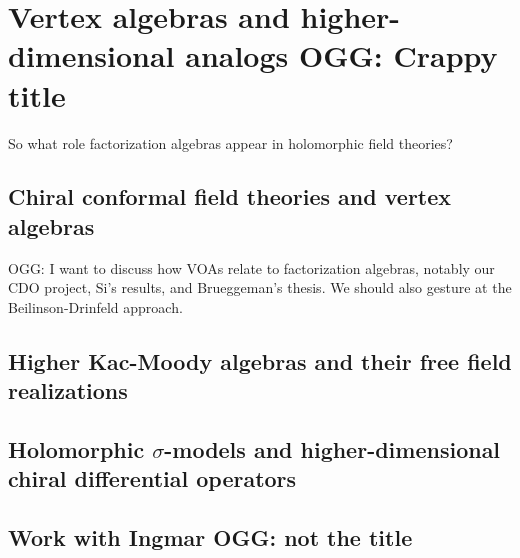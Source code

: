 \documentclass[11pt]{amsart}
\author{Owen Gwilliam and Brian R. Williams}
\date{\today}
\def\owen#1{{\textcolor{green!65!black}{OGG: {#1}}}}
\begin{document}

\section{Vertex algebras and higher-dimensional analogs \owen{Crappy title}}

So what role  factorization algebras appear in holomorphic field theories?


\subsection{Chiral conformal field theories and vertex algebras}

\owen{I want to discuss how VOAs relate to factorization algebras, notably our CDO project, Si's results, and Brueggeman's thesis. We should also gesture at the Beilinson-Drinfeld approach.}

\subsection{Higher Kac-Moody algebras and their free field realizations}

\subsection{Holomorphic $\sigma$-models and higher-dimensional chiral differential operators}

\subsection{Work with Ingmar \owen{not the title}}
\end{document}
